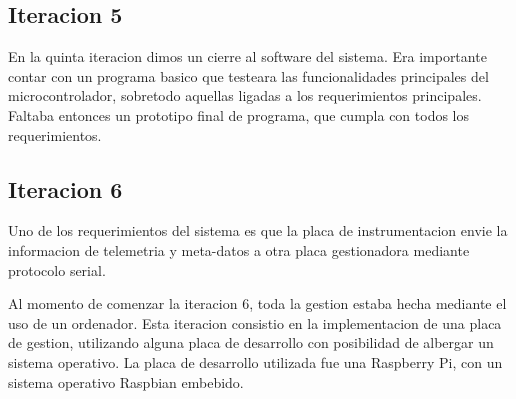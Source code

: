 
\subsection{Iteracion 5} %
\label{sub:iteracion_5}

En la quinta iteracion dimos un cierre al software del sistema. Era importante contar con un programa basico que testeara las funcionalidades principales del microcontrolador, sobretodo aquellas ligadas a los requerimientos principales. Faltaba entonces un prototipo final de programa, que cumpla con todos los requerimientos. 


\subsection{Iteracion 6} %
\label{sub:iteracion_6}

Uno de los requerimientos del sistema es que la placa de instrumentacion envie la informacion de telemetria y meta-datos a otra placa gestionadora mediante protocolo serial. 

Al momento de comenzar la iteracion 6, toda la gestion estaba hecha mediante el uso de un ordenador. Esta iteracion consistio en la implementacion de una placa de gestion, utilizando alguna placa de desarrollo con posibilidad de albergar un sistema operativo. 
La placa de desarrollo utilizada fue una Raspberry Pi, con un sistema operativo Raspbian embebido. 


